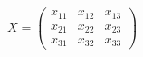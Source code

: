     \begin{center}
        \begin{equation*}
            X =
            \begin{pmatrix}
                x_{11} & x_{12} & x_{13} \\
                x_{21} & x_{22} & x_{23} \\
                x_{31} & x_{32} & x_{33}
            \end{pmatrix}
        \end{equation*}
    \end{center}
